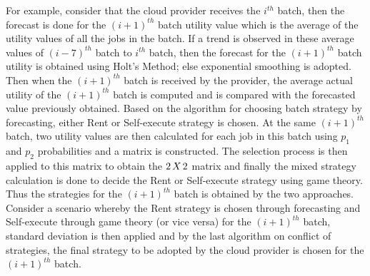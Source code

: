 For example, consider that the cloud provider receives the $i^{th}$ batch, then the forecast is done for the $(i+1)^{th}$ batch utility value which is the average of the utility values of all the jobs in the batch. If a trend is observed in these average values of $(i-7)^{th}$ batch to $i^{th}$ batch, then the forecast for the $(i+1)^{th}$ batch utility is obtained using Holt's Method; else exponential smoothing is adopted. Then when the $(i+1)^{th}$ batch is received by the provider, the average actual utility of the $(i+1)^{th}$ batch is computed and is compared with the forecasted value previously obtained. Based on the algorithm for choosing batch strategy by forecasting, either Rent or Self-execute strategy is chosen. At the same $(i+1)^{th}$ batch, two utility values are then calculated for each job in this batch using $p_1$ and $p_2$ probabilities and a matrix is constructed. The selection process is then applied to this matrix to obtain the $2\hspace*{0.5mm}X\hspace*{0.5mm}2$ matrix and finally the mixed strategy calculation is done to decide the Rent or Self-execute strategy using game theory. Thus the strategies for the $(i+1)^{th}$ batch is obtained by the two approaches. Consider a scenario whereby the Rent strategy is chosen through forecasting and Self-execute through game theory (or vice versa) for the $(i+1)^{th}$ batch, standard deviation is then applied and by the last algorithm on conflict of strategies, the final strategy to be adopted by the cloud provider is chosen for the $(i+1)^{th}$ batch.
